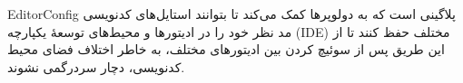 EditorConfig پلاگینی است که به دولوپرها کمک می‌کند تا بتوانند استایل‌های کدنویسی مد نظر خود را در ادیتورها و محیط‌های توسعهٔ یکپارچه (IDE) مختلف حفظ کنند تا از این طریق پس از سوئیچ کردن بین ادیتورهای مختلف، به‌ خاطر اختلاف فضای محیط کدنویسی، دچار سردرگمی نشوند.